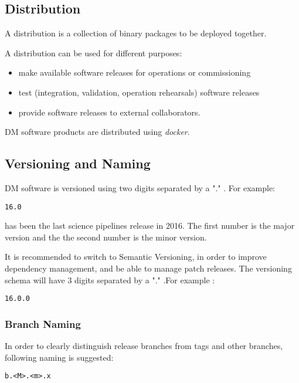 \subsection{Distribution} \label{sect:distribution}

A distribution is a collection of binary packages to be deployed together.

A distribution can be used for different purposes:

\begin{itemize}
\item make available software releases for operations or commissioning
\item test (integration, validation, operation rehearsals) software releases
\item provide software releases to external collaborators.
\end{itemize}

DM software products are distributed using \textit{docker}.


\newpage
\subsection{Versioning and Naming} \label{sect:versioning}

DM software is versioned using two digits separated by a "." .
For example:

\begin{verbatim}
16.0
\end{verbatim}

has been the last science pipelines release in 2016. The first number is the major version and the the second number is the minor version.


It is recommended to switch to Semantic Versioning, in order to improve dependency management, and be able to manage patch releases.
The versioning schema will have 3 digits separated by a "." .For example :

\begin{verbatim}
16.0.0
\end{verbatim}



\subsubsection{Branch Naming}

In order to clearly distinguish release branches from tags and other branches, following naming is suggested:

\begin{verbatim}
b.<M>.<m>.x
\end{verbatim}

